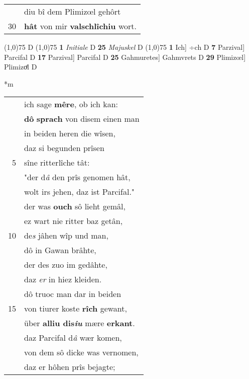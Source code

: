 \documentclass[8pt,a4paper,notitlepage]{article}
\begin{document}
\begin{table}[ht]
\begin{minipage}[t]{0.5\linewidth}
\begin{tabular}{rl}
 & diu bî dem Plimizœl gehôrt\\ 
30 & \textbf{hât} von mir \textbf{valschlîchiu} wort.\\ 
\end{tabular}
\scriptsize
\line(1,0){75} \newline
D \newline
\line(1,0){75} \newline
\textbf{1} \textit{Initiale} D  \textbf{25} \textit{Majuskel} D  \newline
\line(1,0){75} \newline
\textbf{1} Ich] ÷ch D \textbf{7} Parzival] Parcifal D \textbf{17} Parzival] Parcifal D \textbf{25} Gahmuretes] Gahmvrets D \textbf{29} Plimizœl] Plimizoͤl D \newline
\end{minipage}
\hspace{0.5cm}
\begin{minipage}[t]{0.5\linewidth}
\small
\begin{center}*m
\end{center}
\begin{tabular}{rl}
 & ich sage \textbf{mêre}, ob ich kan:\\ 
 & \textbf{dô} \textbf{sprach} von disem einen man\\ 
 & in beiden heren die wîsen,\\ 
 & daz si begunden prîsen\\ 
5 & sîne ritterlîche tât:\\ 
 & "der d\textit{â} den prîs genomen hât,\\ 
 & wolt irs jehen, daz ist Parcifal."\\ 
 & der was \textbf{ouch} sô lieht gemâl,\\ 
 & ez wart nie ritter baz getân,\\ 
10 & de\textit{s} jâhen wîp und man,\\ 
 & dô in Gawan brâhte,\\ 
 & der des zuo im gedâhte,\\ 
 & daz \textit{er} in hiez kleiden.\\ 
 & dô truoc man dar in beiden\\ 
15 & von tiurer koste \textbf{rîch} gewant,\\ 
 & über \textbf{alliu dis\textit{iu}} mære \textbf{erkant}.\\ 
 & daz Parcifal d\textit{â} wær komen,\\ 
 & von dem sô dicke was vernomen,\\ 
 & daz er hôhen prîs bejagte;\\ 

\end{tabular}
\end{minipage}
\end{table}
\end{document}
